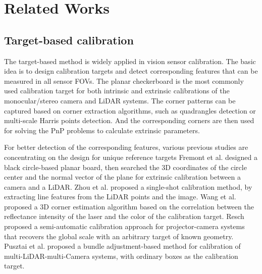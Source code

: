 \documentclass[journal]{vgtc}
\begin{document}
\section{Related Works}


\subsection{Target-based calibration}

The target-based method is widely applied in vision sensor calibration. The basic idea is to design calibration targets and detect corresponding features that can be
 measured in all sensor FOVs. The planar checkerboard is the most commonly used calibration target for both intrinsic and extrinsic calibrations of the monocular/stereo camera and LiDAR systems\cite{fuersattel2017accurate, gu2019environment, prokos2012automatic}. The corner patterns can be captured based on corner extraction algorithms, such as quadrangles detection or multi-scale Harris points detection\cite{de2010automatic,liu2016automatic,geiger2012automatic}. And the corresponding corners are then used for solving the PnP problems to calculate extrinsic parameters. 


For better detection of the corresponding features, various previous studies are concentrating on the design for unique reference targets Fremont et al.\cite{fremont2008extrinsic} designed a black circle-based planar board, then searched the 3D coordinates of the circle center and the normal vector of the plane for extrinsic calibration between a camera and a LiDAR. Zhou et al.\cite{zhou2018automatic} proposed a single-shot calibration method, by extracting line features from the LiDAR points and the image. Wang et al.\cite{wang2017reflectance} proposed a 3D corner estimation algorithm based on the correlation between the reflectance intensity of the laser and the color of the calibration target. Resch \cite{resch2015site} proposed a semi-automatic calibration approach for projector-camera systems that recovers the global scale with an arbitrary target of known geometry. Pusztai et al.  \cite{pusztai2018accurate} proposed a bundle adjustment-based method for calibration of multi-LiDAR-multi-Camera systems, with ordinary boxes as the calibration target.  
\end{document}
